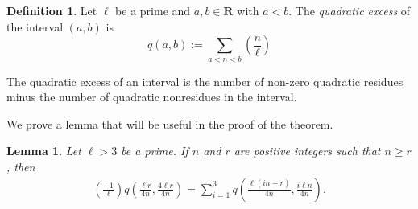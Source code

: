 \documentclass{article}
\newtheorem{lemma}[theorem]{Lemma}
\theoremstyle{remark}
\theoremstyle{definition}
\newtheorem{definition}[theorem]{Definition}
\begin{document}
\begin{definition}
    Let $\ell$ be a prime and $a,b \in \mathbf{R}$ with $a < b$. The \textit{quadratic excess} of the interval $(a,b)$ is \[q(a,b) := \sum_{a < n < b} \left (\frac{n}{\ell} \right )\]
\end{definition}

\par The quadratic excess of an interval is the number of non-zero quadratic residues minus the number of quadratic nonresidues in the interval.

\par We prove a lemma that will be useful in the proof of the theorem.

\begin{lemma}
\label{lemma}
    Let $\ell > 3$ be a prime. If $n$ and $r$ are positive integers such that $n \geq r$, then \begin{align}\left (\frac{-1}{\ell} \right ) q\left(\frac{\ell r}{4n}, \frac{4\ell r}{4n} \right) = \sum_{i=1}^3 q\left (\frac{\ell(in-r)}{4n}, \frac{i\ell n}{4n} \right) \label{lemma-align}. \end{align}
\end{lemma}
\end{document}
